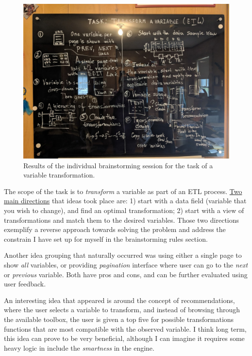 \documentclass[12pt,letterpaper]{article}
\begin{document}
\begin{figure}[h]
\centering
\includegraphics[scale=.3]{figures/m3/brainstorm.jpg}
\caption{Results of the individual brainstorming session for the task of a variable transformation.}
\label{fig::1}
\end{figure}

The scope of the task is to \textit{transform} a variable as part of an ETL process. \underline{Two main directions} that ideas took place are: 1) start with a data field (variable that you wish to change), and find an optimal transformation; 2) start with a view of transformations and match them to the desired variables. Those two directions exemplify a reverse approach towards solving the problem and address the constrain I have set up for myself in the brainstorming rules section.  

Another idea grouping that naturally occurred was using either a single page to show \textit{all} variables, or providing \textit{pagination} interface where user can go to the \textit{next} or \textit{previous} variable. Both have pros and cons, and can be further evaluated using user feedback. 

An interesting idea that appeared is around the concept of recommendations, where the user selects a variable to transform, and instead of browsing through the available toolbox, the user is given a top five for possible transformations functions that are most compatible with the observed variable. I think long term, this idea can prove to be very beneficial, although I can imagine it requires some heavy logic in include the \textit{smartness} in the engine.   
\end{document}
